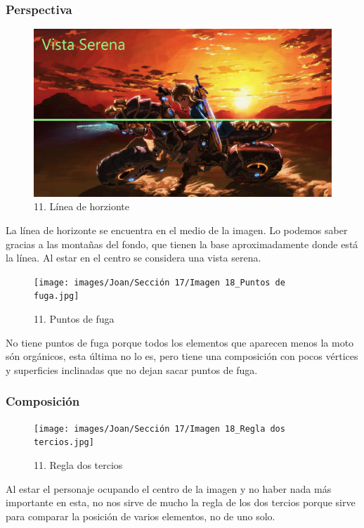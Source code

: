 \documentclass[12pt]{article}
\begin{document}
            \subsubsection{Perspectiva}
            \begin{figure}[H]
          \centering
          \includegraphics[scale=0.35]{images/Joan/Sección 17/Imagen 18_Línea Horizonte.jpg}
          \caption{\small 11. Línea de horzionte}
        \end{figure}
        La línea de horizonte se encuentra en el medio de la imagen. Lo podemos saber gracias a las montañas del fondo, que tienen la base aproximadamente donde está la línea. 
    Al estar en el centro se considera una vista serena. 

        \begin{figure}[H]
          \centering
          \texttt{[image: images/Joan/Sección 17/Imagen 18\_Puntos de fuga.jpg]}
          \caption{\small 11. Puntos de fuga}
        \end{figure}
        No tiene puntos de fuga porque todos los elementos que aparecen menos la moto són orgánicos, esta última no lo es, pero tiene una composición con pocos vértices y superficies inclinadas que no dejan sacar puntos de fuga. 

            \subsubsection{Composición}
            \begin{figure}[H]
          \centering
          \texttt{[image: images/Joan/Sección 17/Imagen 18\_Regla dos tercios.jpg]}
          \caption{\small 11. Regla dos tercios}
        \end{figure}
        Al estar el personaje ocupando el centro de la imagen y no haber nada más importante en esta, no nos sirve de mucho la regla de los dos tercios porque sirve para comparar la posición de varios elementos, no de uno solo. 
\end{document}
